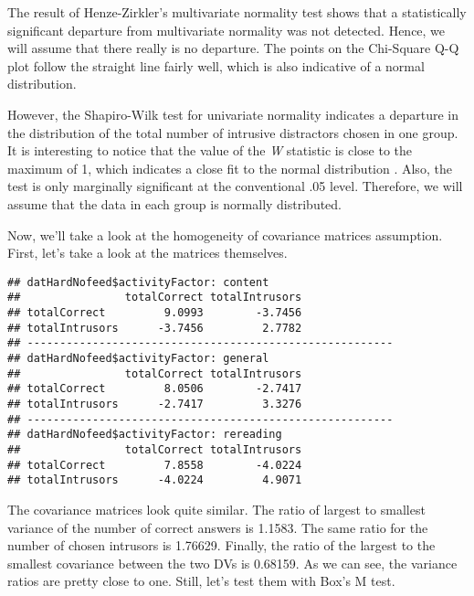 \documentclass[12pt,]{article}
\newenvironment{Shaded}{\begin{snugshade}}{\end{snugshade}}
\newcommand{\DataTypeTok}[1]{\textcolor[rgb]{0.13,0.29,0.53}{#1}}
\newcommand{\KeywordTok}[1]{\textcolor[rgb]{0.13,0.29,0.53}{\textbf{#1}}}
\newcommand{\NormalTok}[1]{#1}
\newcommand{\OperatorTok}[1]{\textcolor[rgb]{0.81,0.36,0.00}{\textbf{#1}}}
\newcommand{\StringTok}[1]{\textcolor[rgb]{0.31,0.60,0.02}{#1}}
\begin{document}
The result of Henze-Zirkler's multivariate normality test shows that a
statistically significant departure from multivariate normality was not
detected. Hence, we will assume that there really is no departure. The
points on the Chi-Square Q-Q plot follow the straight line fairly well,
which is also indicative of a normal distribution.

However, the Shapiro-Wilk test for univariate normality indicates a
departure in the distribution of the total number of intrusive
distractors chosen in one group. It is interesting to notice that the
value of the \emph{W} statistic is close to the maximum of 1, which
indicates a close fit to the normal distribution
\citep{salkind_encyclopedia_2007}. Also, the test is only marginally
significant at the conventional .05 level. Therefore, we will assume
that the data in each group is normally distributed.

Now, we'll take a look at the homogeneity of covariance matrices
assumption. First, let's take a look at the matrices themselves.

\begin{Shaded}
\end{Shaded}

\begin{verbatim}
## datHardNofeed$activityFactor: content
##                totalCorrect totalIntrusors
## totalCorrect         9.0993        -3.7456
## totalIntrusors      -3.7456         2.7782
## -------------------------------------------------------- 
## datHardNofeed$activityFactor: general
##                totalCorrect totalIntrusors
## totalCorrect         8.0506        -2.7417
## totalIntrusors      -2.7417         3.3276
## -------------------------------------------------------- 
## datHardNofeed$activityFactor: rereading
##                totalCorrect totalIntrusors
## totalCorrect         7.8558        -4.0224
## totalIntrusors      -4.0224         4.9071
\end{verbatim}

The covariance matrices look quite similar. The ratio of largest to
smallest variance of the number of correct answers is 1.1583. The same
ratio for the number of chosen intrusors is 1.76629. Finally, the ratio
of the largest to the smallest covariance between the two DVs is
0.68159. As we can see, the variance ratios are pretty close to one.
Still, let's test them with Box's M test.
\end{document}
